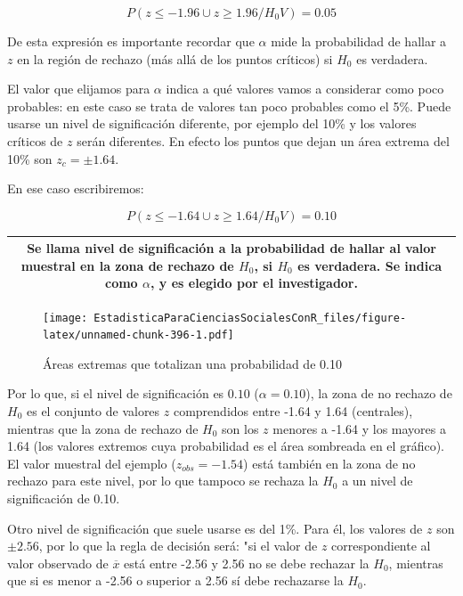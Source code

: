 \documentclass[]{book}
\begin{document}
\[P(z\leq -1.96 \cup z\geq 1.96 / H_{0} V)=0.05\]

De esta expresión es importante recordar que \(\alpha\) mide la probabilidad de hallar a \(z\) en la región de rechazo (más allá de los puntos críticos) si \(H_{0}\) es verdadera.

El valor que elijamos para \(\alpha\) indica a qué valores vamos a considerar como poco probables: en este caso se trata de valores tan poco probables como el 5\%. Puede usarse un nivel de significación diferente, por ejemplo del 10\% y los valores críticos de \(z\) serán diferentes. En efecto los puntos que dejan un área extrema del 10\% son \(z_{c}=\pm1.64\).

En ese caso escribiremos:

\[P(z\leq -1.64 \cup z\geq 1.64 / H_{0} V)=0.10\]

\begin{longtable}[]{@{}c@{}}
\toprule
\endhead
\begin{minipage}[t]{0.97\columnwidth}\centering
Se llama \textbf{nivel de significación} a la probabilidad de hallar al valor muestral en la zona de rechazo de \(H_{0}\), si \(H_{0}\) es verdadera. Se indica como \(\alpha\), y es elegido por el investigador.\strut
\end{minipage}\tabularnewline
\bottomrule
\end{longtable}

\begin{figure}
\centering
\texttt{[image: EstadisticaParaCienciasSocialesConR\_files/figure-latex/unnamed-chunk-396-1.pdf]}
\caption{\label{fig:unnamed-chunk-396}Áreas extremas que totalizan una probabilidad de 0.10}
\end{figure}

Por lo que, si el nivel de significación es \(0.10\) (\(\alpha=0.10\)), la zona de no rechazo de \(H_{0}\) es el conjunto de valores \(z\) comprendidos entre -1.64 y 1.64 (centrales), mientras que la zona de rechazo de \(H_{0}\) son los \(z\) menores a -1.64 y los mayores a 1.64 (los valores extremos cuya probabilidad es el área sombreada en el gráfico). El valor muestral del ejemplo (\(z_{obs} = - 1.54\)) está también en la zona de no rechazo para este nivel, por lo que tampoco se rechaza la \(H_{0}\) a un nivel de significación de 0.10.

Otro nivel de significación que suele usarse es del 1\%. Para él, los
valores de \(z\) son \(\pm2.56\), por lo que la regla de decisión será: "si el valor de \(z\) correspondiente al valor observado de \(\overline{x}\) está entre -2.56 y 2.56 no se debe rechazar la \(H_{0}\), mientras que si es menor a -2.56 o superior a 2.56 sí debe rechazarse la \(H_{0}\).
\end{document}
